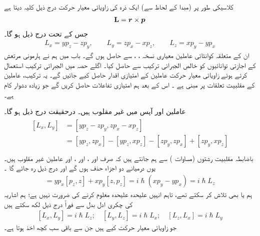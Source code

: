  کلاسیکی طور پر  (مبدا کے لحاظ سے)  ایک ذرہ کی زاویائی معیار حرکت درج ذیل کلیہ دیتا ہے 
\begin{align}
\operatorname{\mathbf{L}}={{\boldsymbol{r}}}\times{\ensuremath{{\boldsymbol{p}}}}
\end{align}
جس کے تحت درج ذیل ہو گا۔
\begin{align}\label{مساوات_تین_ابعادی_متعدد_رشتے}
L_{x}=yp_{z}-zp_{y}, \quad\quad L_{y}=zp_{x}-xp_{z}, \quad \quad L_{z}=xp_{y}-yp_{x}
\end{align}
ان کے متعلقہ کوانٹائی عاملین معیاری نسخہ ، ،    سے حاصل ہوں گے۔ باب    میں ہم نے ہارمونی مرتعش کے اجازتی  توانائیوں کو خالص الجبرائی ترکیب سے حاصل کیا۔  اگلے  حصہ میں  الجبرائی ترکیب  استعمال کرتے ہوئے زاویائی معیار حرکت  عاملین کے امتیازی اقدار حاصل کیے جائیں گے۔ یہ ترکیب،  عاملین کے  مقلبیت  تعلقات پر مبنی ہے ۔ اس کے بعد ہم امتیازی تفاعلات حاصل کریں گے جو  زیادہ دشوار کام ہے۔

عاملین  اور  آپس میں غیر مقلوب  ہیں۔ درحقیقت درج ذیل ہو گا۔
\begin{gather}
\begin{aligned}
[L_{x},L_{y}]&=[yp_{z}-zp_{y},zp_{x}-xp_{z}]\\
&=[yp_{z},zp_{x}]-[yp_{z},xp_{z}]-[zp_{y},zp_{x}]+[zp_{y},xp_{z}]\\
\end{aligned}
\end{gather}
باضابطہ مقلبیت رشتوں  (مساوات )  سے ہم جانتے ہیں کہ صرف  اور ،   اور ،   اور  عاملین   غیر مقلوب ہیں۔  یوں درمیانے  دو اجزاء  حذف ہوں گے اور  درج ذیل  رہ جائے گا ۔
\begin{align}
[L_x, L_y] = y p_x [p_z, z] + x p_y [z, p_z] = i \hslash (x p_y - y p_x) = i \hslash L_z
\end{align}
ہم  یا  بھی تلاش کر سکتے تھے،  تاہم انہیں علیحدہ علیحدہ معلوم کرنے کی ضرورت نہیں ہے؛  ہم اشاریہ کی
 چکری   ادل بدل  سے فوراً درج ذیل لکھ سکتے ہیں 
\begin{align}\label{مساوات_تین_ابعادی_بنیادی_مقلبیت_رشتہ}
[L_x, L_y] = i \hslash L_z ; \quad [L_y, L_z] = i \hslash L_x ; \quad [L_z, L_x] = i \hslash L_y
\end{align}
جو زاویائی معیار حرکت کیے   ہیں جن سے باقی سب کچھ اخذ ہوتا ہے۔

